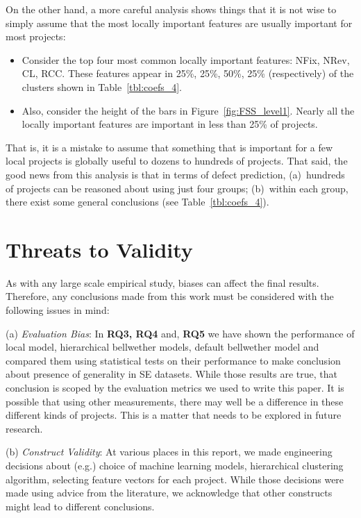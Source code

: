 \documentclass[10pt,journal,compsoc]{IEEEtran}
\newcommand{\fig}[1]{Figure~\ref{fig:#1}}
\newcommand{\bi}{\begin{itemize}}
\newcommand{\ei}{\end{itemize}}
\begin{document}
On the other hand, a more careful analysis shows things that it is not wise to simply assume that the most locally important features are usually important for most projects:
\bi
\item
Consider the top four most common locally important features: NFix, NRev, CL, RCC. These features appear in  25\%, 25\%, 50\%, 25\% 
(respectively) of the clusters shown in Table~\ref{tbl:coefs_4}. 
\item
Also, consider the height of the bars in \fig{FSS_level1}. Nearly all the locally important features are important in less than 25\% of projects.
\ei
That is,  it is a mistake to assume that something that is  important for a few local projects is globally useful to dozens to hundreds of projects. 
That said, the good news from this analysis is that in terms of defect prediction,
 (a)~hundreds of projects can be reasoned about using just four groups; (b)~within each group, there exist some general conclusions (see Table~\ref{tbl:coefs_4}). 
 
 



\section{Threats to Validity}
\label{sec:validity}

As with any large scale empirical study, biases can affect the final
results. Therefore, any conclusions made from this work
must be considered with the following issues in mind:

(a) \textit{Evaluation Bias}: 
In  {\bf  RQ3, RQ4} and, {\bf RQ5} we have shown the performance of local model, hierarchical bellwether models, default bellwether model and compared them using statistical tests on their performance to make conclusion about presence of generality in SE datasets. While those results are true, that conclusion is scoped by the evaluation metrics we used to write this paper. It is possible that using other measurements, there may well be a difference in these different kinds of projects. This is a matter that needs to be explored in future research.  

    
(b) \textit{Construct Validity}: At various places in this report, we made engineering decisions about (e.g.) choice of machine learning models, hierarchical clustering algorithm, selecting feature vectors for each project. While those decisions were made using advice from the literature, we acknowledge that other constructs might lead to different conclusions. 
\end{document}

